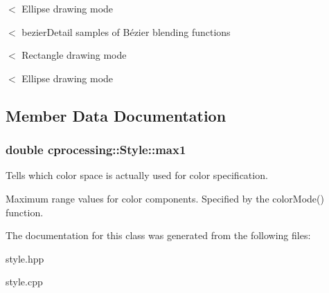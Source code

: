 $<$ \-Ellipse drawing mode

$<$ bezier\-Detail samples of \-Bézier blending functions

$<$ \-Rectangle drawing mode

$<$ \-Ellipse drawing mode 

\subsection{\-Member \-Data \-Documentation}
\hypertarget{classcprocessing_1_1Style_a7eec2077d120edee546ef5c396bd76b4}{
\subsubsection[{max1}]{\setlength{\rightskip}{0pt plus 5cm}double {\bf cprocessing\-::\-Style\-::max1}}}\label{classcprocessing_1_1Style_a7eec2077d120edee546ef5c396bd76b4}


\-Tells which color space is actually used for color specification. 

\-Maximum range values for color components. \-Specified by the color\-Mode() function. 

\-The documentation for this class was generated from the following files\-:\begin{DoxyCompactItemize}
\item 
style.\-hpp\item 
style.\-cpp\end{DoxyCompactItemize}
